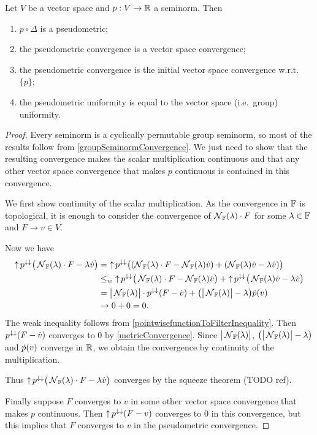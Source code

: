 \begin{lemma} \label{seminormPseudometricLemma}
Let $V$ be a vector space and $p:V\to \mathbb{R}$ a seminorm. Then
\begin{enumerate}
\item $p\circ \Delta$ is a pseudometric;
\item the pseudometric convergence is a vector space convergence;
\item the pseudometric convergence is the initial vector space convergence w.r.t. $\{p\}$;
\item the pseudometric uniformity is equal to the vector space (i.e.\ group) uniformity.
\end{enumerate}
\end{lemma}
\begin{proof}
Every seminorm is a cyclically permutable group seminorm, so most of the results follow from \ref{groupSeminormConvergence}. We just need to show that the resulting convergence makes the scalar multiplication continuous and that any other vector space convergence that makes $p$ continuous is contained in this convergence.

We first show continuity of the scalar multiplication. As the convergence in $\mathbb{F}$ is topological, it is enough to consider the convergence of $\operatorname{\mathcal{N}}_{\mathbb{F}}(\lambda)\cdot F$ for some $\lambda \in \mathbb{F}$ and $F\to v\in V$. 

Now we have
\begin{align*}
\operatorname{\uparrow} p^{\downarrow\downarrow}\big(\operatorname{\mathcal{N}}_{\mathbb{F}}(\lambda)\cdot F - \lambda \dot{v}\big) &= \operatorname{\uparrow} p^{\downarrow\downarrow}\big((\operatorname{\mathcal{N}}_{\mathbb{F}}(\lambda)\cdot F - \operatorname{\mathcal{N}}_{\mathbb{F}}(\lambda)\dot{v}) + (\operatorname{\mathcal{N}}_{\mathbb{F}}(\lambda)\dot{v} -\lambda \dot{v})\big) \\
&\leq_w \operatorname{\uparrow} p^{\downarrow\downarrow}\big(\operatorname{\mathcal{N}}_{\mathbb{F}}(\lambda)\cdot F - \operatorname{\mathcal{N}}_{\mathbb{F}}(\lambda)\dot{v}\big) + \operatorname{\uparrow} p^{\downarrow\downarrow}\big(\operatorname{\mathcal{N}}_{\mathbb{F}}(\lambda)\dot{v} -\lambda \dot{v}\big) \\
&= \big|\operatorname{\mathcal{N}}_{\mathbb{F}}(\lambda)\big|\cdot p^{\downarrow\downarrow}(F-\dot{v}) + \big(\big|\operatorname{\mathcal{N}}_{\mathbb{F}}(\lambda)\big| - \lambda\big)\dot{p}(v) \\
&\to 0 + 0 = 0.
\end{align*}
The weak inequality follows from \ref{pointwisefunctionToFilterInequality}. Then $p^{\downarrow\downarrow}(F-\dot{v})$ converges to $0$ by \ref{metricConvergence}.
Since $\big|\operatorname{\mathcal{N}}_{\mathbb{F}}(\lambda)\big|$, $\big(\big|\operatorname{\mathcal{N}}_{\mathbb{F}}(\lambda)\big| - \lambda\big)$ and $\dot{p}(v)$ converge in $\mathbb{R}$, we obtain the convergence by continuity of the multiplication.

Thus $\operatorname{\uparrow} p^{\downarrow\downarrow}\big(\operatorname{\mathcal{N}}_{\mathbb{F}}(\lambda)\cdot F - \lambda \dot{v}\big)$ converges by the squeeze theorem (TODO ref).

Finally suppose $F$ converges to $v$ in some other vector space convergence that makes $p$ continuous. Then $\operatorname{\uparrow} p^{\downarrow\downarrow}(F-v)$ converges to $0$ in this convergence, but this implies that $F$ converges to $v$ in the pseudometric convergence.
\end{proof}

